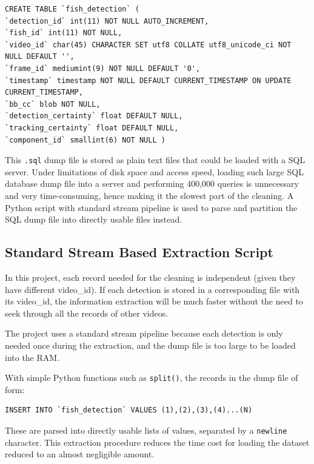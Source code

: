 \documentclass[bsc,logo,twoside,fullspacing,parskip]{infthesis}
\begin{document}
\lstset{basicstyle=\tiny\ttfamily,breaklines=true,style=sql}
\begin{lstlisting}[frame=single]
CREATE TABLE `fish_detection` (
`detection_id` int(11) NOT NULL AUTO_INCREMENT,
`fish_id` int(11) NOT NULL,
`video_id` char(45) CHARACTER SET utf8 COLLATE utf8_unicode_ci NOT NULL DEFAULT '',
`frame_id` mediumint(9) NOT NULL DEFAULT '0',
`timestamp` timestamp NOT NULL DEFAULT CURRENT_TIMESTAMP ON UPDATE CURRENT_TIMESTAMP,
`bb_cc` blob NOT NULL,
`detection_certainty` float DEFAULT NULL,
`tracking_certainty` float DEFAULT NULL,
`component_id` smallint(6) NOT NULL )
\end{lstlisting}

This {\tt .sql} dump file is stored as plain text files that could be loaded with a SQL server.
Under limitations of disk space and access speed, loading such large SQL database dump file into a server and performing 400,000 queries is unnecessary and very time-consuming, hence making it the slowest part of the cleaning. 
A Python script with standard stream pipeline is used to parse and partition the SQL dump file into directly usable files instead.

\subsection{Standard Stream Based Extraction Script}

In this project, each record needed for the cleaning is independent (given they have different video\_id). 
If each detection is stored in a corresponding file with its video\_id, the information extraction will be much faster without the need to seek through all the records of other videos.

The project uses a standard stream pipeline because each detection is only needed once during the extraction, and the dump file is too large to be loaded into the RAM.

With simple Python functions such as {\tt split()}, the records in the dump file of form:
\lstset{basicstyle=\small\ttfamily,breaklines=true,style=sql}
\begin{lstlisting}[frame=single]
 INSERT INTO `fish_detection` VALUES (1),(2),(3),(4)...(N)
\end{lstlisting}
These are parsed into directly usable lists of values, separated by a {\tt newline} character.
This extraction procedure reduces the time cost for loading the dataset reduced to an almost negligible amount. 
\end{document}
